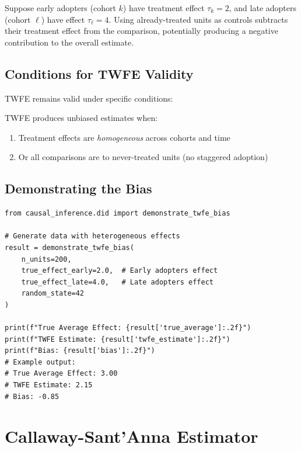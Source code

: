 \begin{example}
Suppose early adopters (cohort $k$) have treatment effect $\tau_k = 2$, and late adopters (cohort $\ell$) have effect $\tau_\ell = 4$. Using already-treated units as controls subtracts their treatment effect from the comparison, potentially producing a negative contribution to the overall estimate.
\end{example}

\subsection{Conditions for TWFE Validity}

TWFE remains valid under specific conditions:

\begin{proposition}
TWFE produces unbiased estimates when:
\begin{enumerate}
    \item Treatment effects are \emph{homogeneous} across cohorts and time
    \item Or all comparisons are to never-treated units (no staggered adoption)
\end{enumerate}
\end{proposition}

\subsection{Demonstrating the Bias}

\begin{verbatim}
from causal_inference.did import demonstrate_twfe_bias

# Generate data with heterogeneous effects
result = demonstrate_twfe_bias(
    n_units=200,
    true_effect_early=2.0,  # Early adopters effect
    true_effect_late=4.0,   # Late adopters effect
    random_state=42
)

print(f"True Average Effect: {result['true_average']:.2f}")
print(f"TWFE Estimate: {result['twfe_estimate']:.2f}")
print(f"Bias: {result['bias']:.2f}")
# Example output:
# True Average Effect: 3.00
# TWFE Estimate: 2.15
# Bias: -0.85
\end{verbatim}

\section{Callaway-Sant'Anna Estimator}
\label{sec:callaway_santanna}

